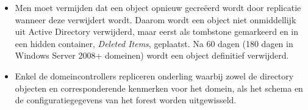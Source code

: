 \begin{enumerate}
{\begin{itemize}
				\item Men moet vermijden dat een object opnieuw gecreëerd wordt door replicatie wanneer deze verwijdert wordt. Daarom wordt een object niet onmiddellijk uit Active Directory verwijderd, maar eerst als tombstone gemarkeerd en in een hidden container, \textit{Deleted Items}, geplaatst. Na 60 dagen (180 dagen in Windows Server 2008+ domeinen) wordt een object definitief verwijderd. 
			\end{itemize}
		}
		
		 {
			\begin{itemize}
				\item Enkel de domeincontrollers repliceren onderling waarbij zowel de directory objecten en corresponderende kenmerken voor het domein, als het schema en de configuratiegegevens van het forest worden uitgewisseld.
			\end{itemize}

		}
		

\end{enumerate}
